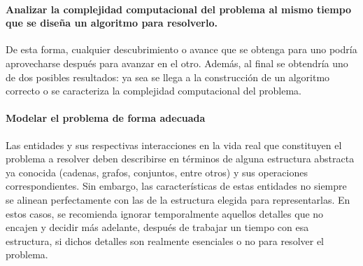 \paragraph*{Analizar la complejidad computacional del problema al mismo tiempo que se diseña un algoritmo para resolverlo.}{
  De esta forma, cualquier descubrimiento o avance que se obtenga para uno podría aprovecharse después para avanzar en el otro.
  Además, al final se obtendría uno de dos posibles resultados: ya sea se llega a la construcción de un algoritmo correcto o se caracteriza la complejidad computacional del problema.
}

\paragraph*{Modelar el problema de forma adecuada}{
  Las entidades y sus respectivas interacciones en la vida real que constituyen el problema a resolver deben describirse en términos de alguna estructura abstracta ya conocida (cadenas, grafos, conjuntos, entre otros) y sus operaciones correspondientes.
  Sin embargo, las características de estas entidades no siempre se alinean perfectamente con las de la estructura elegida para representarlas.
  En estos casos, se recomienda ignorar temporalmente aquellos detalles que no encajen y decidir más adelante, después de trabajar un tiempo con esa estructura, si dichos detalles son realmente esenciales o no para resolver el problema.
}
